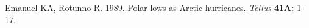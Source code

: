\begin{thebibliography}{12}
Emanuel KA, Rotunno R. 1989. Polar lows as Arctic hurricanes. \textit{Tellus} \textbf{41A:} 1-17.
\end{thebibliography}